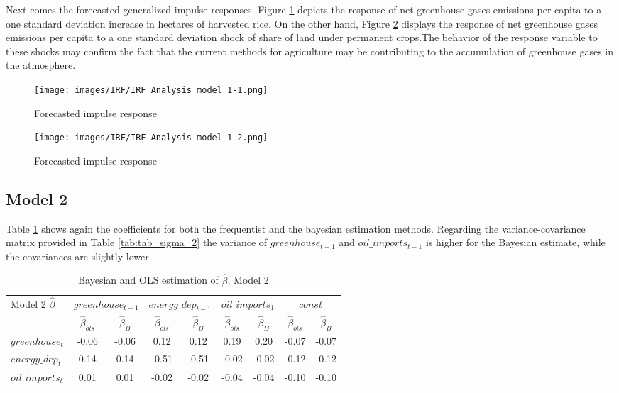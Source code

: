 \documentclass[12pt]{article}
\begin{document}
Next comes the forecasted generalized impulse responses. Figure \ref{fig:IRF1_1} depicts the response of net greenhouse gases emissions per capita to a one standard deviation increase in hectares of harvested rice. On the other hand, Figure \ref{fig:IRF1_2} displays the response of net greenhouse gases emissions per capita to a one standard deviation shock of share of land under permanent crops.The behavior of the response variable to these shocks may confirm the fact that the current methods for agriculture may be contributing to the accumulation of greenhouse gases in the atmosphere.\\

 \begin{figure}[H]
    \centering
    \texttt{[image: images/IRF/IRF Analysis model 1-1.png]}
    \caption{Forecasted impulse response}
    \label{fig:IRF1_1}
\end{figure}

 \begin{figure}[H]
    \centering
    \texttt{[image: images/IRF/IRF Analysis model 1-2.png]}
    \caption{Forecasted impulse response}
    \label{fig:IRF1_2}
\end{figure}


\subsection*{Model 2} \label{Results_model2}

Table \ref{tab:tab_beta_2} shows again the coefficients for both the frequentist and the bayesian estimation methods. Regarding the variance-covariance matrix provided in Table \ref{tab:tab_sigma_2} the variance of $greenhouse_{t-1}$ and $oil\_imports_{t-1}$ is higher for the Bayesian estimate, while the covariances are slightly lower. \\

\begin{table}[H]
\centering
\label{tab:tab_beta_2}
\begin{tabular}{|l|c|c|c|c|c|c|c|c|}
  \hline
 \multirow{2}{*}{Model 2 $\hat{\beta}$} & \multicolumn{2}{c|}{$greenhouse_{t-1}$} & \multicolumn{2}{c|}{$energy\_dep_{t-1}$}  & \multicolumn{2}{c|}{$oil\_imports_{1}$} & \multicolumn{2}{c|}{$const$} \\  \cline{2-9}
 & $\hat{\beta}_{ols}$ & $\hat{\beta}_{B}$ & $\hat{\beta}_{ols}$ & $\hat{\beta}_{B}$ & $\hat{\beta}_{ols}$ & $\hat{\beta}_{B}$ & $\hat{\beta}_{ols}$ & $\hat{\beta}_{B}$\\
  \hline
    $greenhouse_{t}$ & -0.06 & -0.06 & 0.12 & 0.12 & 0.19  &  0.20 &  -0.07  & -0.07  \\ 
    $energy\_dep_{t}$ & 0.14 & 0.14 & -0.51 &  -0.51 & -0.02 & -0.02 &-0.12 & -0.12\\ 
    $oil\_imports_{t}$ & 0.01 & 0.01 & -0.02 & -0.02 & -0.04 & -0.04 & -0.10 & -0.10 \\ 
   \hline
\end{tabular}
\caption{Bayesian and OLS estimation of $\hat{\beta}$, Model 2} \label{tab:tab_beta_2}
\end{table}
\end{document}
